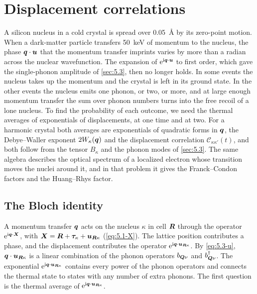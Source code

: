 \section{Displacement correlations}\label{sec:5.6}

A silicon nucleus in a cold crystal is spread over \SI{0.05}{\angstrom} by its zero-point motion. When a dark-matter particle transfers \SI{50}{keV} of momentum to the nucleus, the phase $\bm{q}\cdot\bm{u}$ that the momentum transfer imprints varies by more than a radian across the nuclear wavefunction. The expansion of $\mathrm{e}^{\mathrm{i}\bm{q}\cdot\bm{u}}$ to first order, which gave the single-phonon amplitude of \cref{sec:5.3}, then no longer holds. In some events the nucleus takes up the momentum and the crystal is left in its ground state. In the other events the nucleus emits one phonon, or two, or more, and at large enough momentum transfer the sum over phonon numbers turns into the free recoil of a lone nucleus. To find the probability of each outcome, we need the thermal averages of exponentials of displacements, at one time and at two. For a harmonic crystal both averages are exponentials of quadratic forms in $\bm{q}$, the Debye--Waller exponent $2W_\kappa(\bm{q})$ and the displacement correlation $\mathcal{C}_{\kappa\kappa'}(t)$, and both follow from the tensor $B_\kappa$ and the phonon modes of \cref{sec:5.3}. The same algebra describes the optical spectrum of a localized electron whose transition moves the nuclei around it, and in that problem it gives the Franck--Condon factors and the Huang--Rhys factor.

\subsection{The Bloch identity}

A momentum transfer $\bm{q}$ acts on the nucleus $\kappa$ in cell $\bm{R}$ through the operator $\mathrm{e}^{\mathrm{i}\bm{q}\cdot\bm{X}}$, with $\bm{X} = \bm{R} + \bm{\tau}_\kappa + \bm{u}_{\bm{R}\kappa}$ (\cref{eq:5.1-X}). The lattice position contributes a phase, and the displacement contributes the operator $\mathrm{e}^{\mathrm{i}\bm{q}\cdot\bm{u}_{\bm{R}\kappa}}$. By \cref{eq:5.3-u}, $\bm{q}\cdot\bm{u}_{\bm{R}\kappa}$ is a linear combination of the phonon operators $b_{\bm{Q}\nu}$ and $b^\dagger_{\bm{Q}\nu}$. The exponential $\mathrm{e}^{\mathrm{i}\bm{q}\cdot\bm{u}_{\bm{R}\kappa}}$ contains every power of the phonon operators and connects the thermal state to states with any number of extra phonons. The first question is the thermal average of $\mathrm{e}^{\mathrm{i}\bm{q}\cdot\bm{u}_{\bm{R}\kappa}}$.

